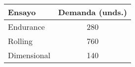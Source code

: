 \documentclass[varwidth=\maxdimen]{standalone}
\begin{document}
\begin{tabular}{ l c }
	\toprule
	Ensayo & Demanda (unds.) \\
	\midrule
	Endurance	& 280 \\
	Rolling		& 760 \\
	Dimensional	& 140 \\
	\bottomrule
\end{tabular}
\end{document}
